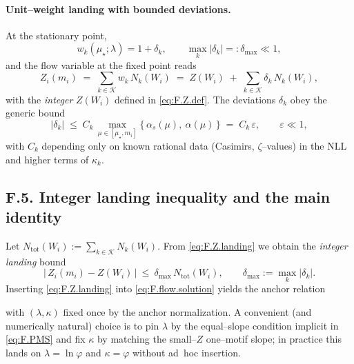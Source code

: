 \documentclass[epjc3]{svjour3}
\begin{document}
\paragraph{Unit--weight landing with bounded deviations.}
At the stationary point,
\begin{equation}
  w_k(\mu_\star;\lambda)=1+\delta_k,\qquad \max_k|\delta_k|=: \delta_{\max}\ll 1,
  \label{eq:F.delta.def}
\end{equation}
and the flow variable at the fixed point reads
\begin{equation}
  Z_i(m_i)\;=\;\sum_{k\in\mathcal K} w_k\,N_k(W_i)
  \;=\;Z(W_i)\;+\;\sum_{k\in\mathcal K}\delta_k\,N_k(W_i),
  \label{eq:F.Z.landing}
\end{equation}
with the \emph{integer} $Z(W_i)$ defined in \eqref{eq:F.Z.def}.  The deviations $\delta_k$ obey the generic bound
\begin{equation}
  |\delta_k|\;\le\;C_k\,
  \max_{\mu\in[\mu_\star,m_i]}\bigl\{\,\alpha_s(\mu),\ \alpha(\mu)\,\bigr\}
  \;=\;C_k\,\varepsilon,
  \qquad \varepsilon\ll 1,
  \label{eq:F.delta.bound}
\end{equation}
with $C_k$ depending only on known rational data (Casimirs, $\zeta$--values) in the NLL and higher terms of $\kappa_k$.


\subsection*{F.5. Integer landing inequality and the main identity}
Let $N_{\mathrm{tot}}(W_i):=\sum_{k\in\mathcal K}N_k(W_i)$.  From \eqref{eq:F.Z.landing} we obtain the \emph{integer landing} bound
\begin{equation}
  \boxed{\quad
  \bigl|\,Z_i(m_i)-Z(W_i)\,\bigr|
  \ \le\ \delta_{\max}\,N_{\mathrm{tot}}(W_i),
  \qquad \delta_{\max}:=\max_k|\delta_k|.
  \quad}
  \label{eq:F.integer.landing}
\end{equation}
Inserting \eqref{eq:F.Z.landing} into \eqref{eq:F.flow.solution} yields the anchor relation

with $(\lambda,\kappa)$ fixed once by the anchor normalization.  A convenient (and numerically natural) choice is to pin $\lambda$ by the equal--slope condition implicit in \eqref{eq:F.PMS} and fix $\kappa$ by matching the small--$Z$ one--motif slope; in practice this lands on $\lambda=\ln\varphi$ and $\kappa=\varphi$ without ad~hoc insertion.
\end{document}
